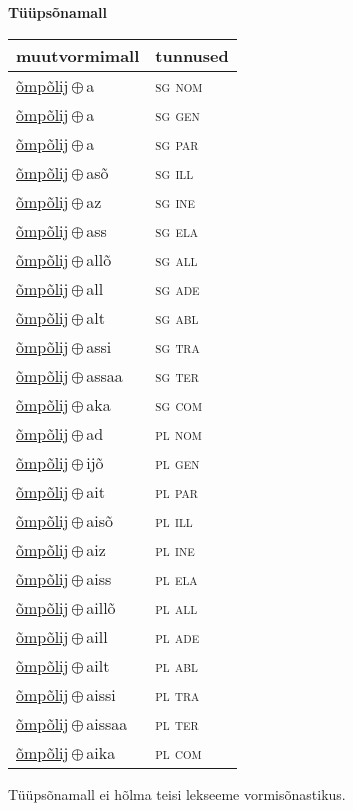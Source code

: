 

\vspace{3.5em}
\noindent \begin{minipage}{\textwidth}
\noindent \textbf{Tüüpsõnamall \,}\\

\begin{sideways}
\begin{tabular}{l l}
muutvormimall & tunnused \\
\hline
\underline{õmpõlij}\,$\oplus$\,a & \textsc{ sg nom } \\
\underline{õmpõlij}\,$\oplus$\,a & \textsc{ sg gen } \\
\underline{õmpõlij}\,$\oplus$\,a & \textsc{ sg par } \\
\underline{õmpõlij}\,$\oplus$\,asõ & \textsc{ sg ill } \\
\underline{õmpõlij}\,$\oplus$\,az & \textsc{ sg ine } \\
\underline{õmpõlij}\,$\oplus$\,ass & \textsc{ sg ela } \\
\underline{õmpõlij}\,$\oplus$\,allõ & \textsc{ sg all } \\
\underline{õmpõlij}\,$\oplus$\,all & \textsc{ sg ade } \\
\underline{õmpõlij}\,$\oplus$\,alt & \textsc{ sg abl } \\
\underline{õmpõlij}\,$\oplus$\,assi & \textsc{ sg tra } \\
\underline{õmpõlij}\,$\oplus$\,assaa & \textsc{ sg ter } \\
\underline{õmpõlij}\,$\oplus$\,aka & \textsc{ sg com } \\
\underline{õmpõlij}\,$\oplus$\,ad & \textsc{ pl nom } \\
\underline{õmpõlij}\,$\oplus$\,ijõ & \textsc{ pl gen } \\
\underline{õmpõlij}\,$\oplus$\,ait & \textsc{ pl par } \\
\underline{õmpõlij}\,$\oplus$\,aisõ & \textsc{ pl ill } \\
\underline{õmpõlij}\,$\oplus$\,aiz & \textsc{ pl ine } \\
\underline{õmpõlij}\,$\oplus$\,aiss & \textsc{ pl ela } \\
\underline{õmpõlij}\,$\oplus$\,aillõ & \textsc{ pl all } \\
\underline{õmpõlij}\,$\oplus$\,aill & \textsc{ pl ade } \\
\underline{õmpõlij}\,$\oplus$\,ailt & \textsc{ pl abl } \\
\underline{õmpõlij}\,$\oplus$\,aissi & \textsc{ pl tra } \\
\underline{õmpõlij}\,$\oplus$\,aissaa & \textsc{ pl ter } \\
\underline{õmpõlij}\,$\oplus$\,aika & \textsc{ pl com } \\
\end{tabular}
\end{sideways}
\label{tab:tüüpsõnamall-õmpõlija}

\end{minipage}

 
\vspace{1em}
\noindent Tüüpsõnamall  ei hõlma teisi lekseeme vormi\-sõnastikus.
